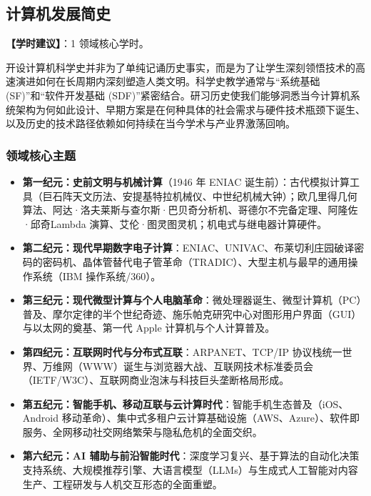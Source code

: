 \subsection{计算机发展简史}
\textbf{【学时建议】}：1 领域核心学时。

开设计算机科学史并非为了单纯记诵历史事实，而是为了让学生深刻领悟技术的高速演进如何在长周期内深刻塑造人类文明。科学史教学通常与“系统基础 (SF)”和“软件开发基础 (SDF)”紧密结合。研习历史使我们能够洞悉当今计算机系统架构为何如此设计、早期方案是在何种具体的社会需求与硬件技术瓶颈下诞生、以及历史的技术路径依赖如何持续在当今学术与产业界激荡回响。

\subsubsection{领域核心主题}
\begin{itemize}
    \item \textbf{第一纪元：史前文明与机械计算}（1946 年 ENIAC 诞生前）：古代模拟计算工具（巨石阵天文历法、安提基特拉机械仪、中世纪机械大钟）；欧几里得几何算法、阿达·洛夫莱斯与查尔斯·巴贝奇分析机、哥德尔不完备定理、阿隆佐·邱奇Lambda 演算、艾伦·图灵图灵机；机电式与继电器计算硬件。
    \item \textbf{第二纪元：现代早期数字电子计算}：ENIAC、UNIVAC、布莱切利庄园破译密码的密码机、晶体管替代电子管革命（TRADIC）、大型主机与最早的通用操作系统（IBM 操作系统/360）。
    \item \textbf{第三纪元：现代微型计算与个人电脑革命}：微处理器诞生、微型计算机（PC）普及、摩尔定律的半个世纪奇迹、施乐帕克研究中心对图形用户界面（GUI）与以太网的奠基、第一代 Apple 计算机与个人计算普及。
    \item \textbf{第四纪元：互联网时代与分布式互联}：ARPANET、TCP/IP 协议栈统一世界、万维网（WWW）诞生与浏览器大战、互联网技术标准委员会（IETF/W3C）、互联网商业泡沫与科技巨头垄断格局形成。
    \item \textbf{第五纪元：智能手机、移动互联与云计算时代}：智能手机生态普及（iOS、Android 移动革命）、集中式多租户云计算基础设施（AWS、Azure）、软件即服务、全网移动社交网络繁荣与隐私危机的全面交织。
    \item \textbf{第六纪元：AI 辅助与前沿智能时代}：深度学习复兴、基于算法的自动化决策支持系统、大规模推荐引擎、大语言模型（LLMs）与生成式人工智能对内容生产、工程研发与人机交互形态的全面重塑。
\end{itemize}

